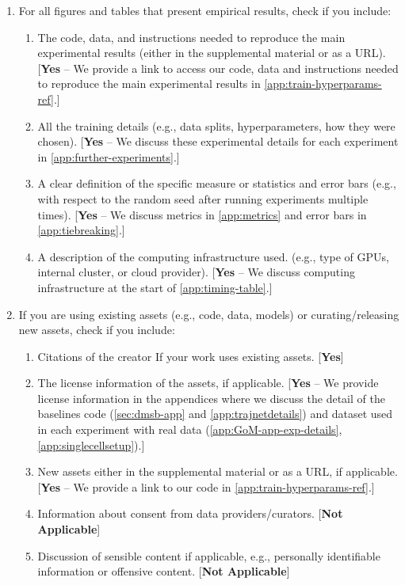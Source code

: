 \documentclass[twoside]{article}
\begin{document}
{\begin{enumerate}
 \item For all figures and tables that present empirical results, check if you include:
 \begin{enumerate}
   \item The code, data, and instructions needed to reproduce the main experimental results (either in the supplemental material or as a URL). [\textbf{Yes} -- We provide a link to access our code, data and instructions needed to reproduce the main experimental results in \cref{app:train-hyperparams-ref}.]
   \item All the training details (e.g., data splits, hyperparameters, how they were chosen). [\textbf{Yes} -- We discuss these experimental details for each experiment in \cref{app:further-experiments}.]
         \item A clear definition of the specific measure or statistics and error bars (e.g., with respect to the random seed after running experiments multiple times). [\textbf{Yes} -- We discuss metrics in \cref{app:metrics} and error bars in \cref{app:tiebreaking}.]
         \item A description of the computing infrastructure used. (e.g., type of GPUs, internal cluster, or cloud provider). [\textbf{Yes} -- We discuss computing infrastructure at the start of \cref{app:timing-table}.]
 \end{enumerate}

 \item If you are using existing assets (e.g., code, data, models) or curating/releasing new assets, check if you include:
 \begin{enumerate}
   \item Citations of the creator If your work uses existing assets. [\textbf{Yes}]
   \item The license information of the assets, if applicable. [\textbf{Yes} -- We provide license information in the appendices where we discuss the detail of the baselines code (\cref{sec:dmsb-app} and \cref{app:trajnetdetails}) and dataset used in each experiment with real data (\cref{app:GoM-app-exp-details}, \cref{app:singlecellsetup}).]
   \item New assets either in the supplemental material or as a URL, if applicable. [\textbf{Yes} -- We provide a link to our code in \cref{app:train-hyperparams-ref}.]
   \item Information about consent from data providers/curators. [\textbf{Not Applicable}]
   \item Discussion of sensible content if applicable, e.g., personally identifiable information or offensive content. [\textbf{Not Applicable}]
 \end{enumerate}


\end{enumerate}}
\end{document}
